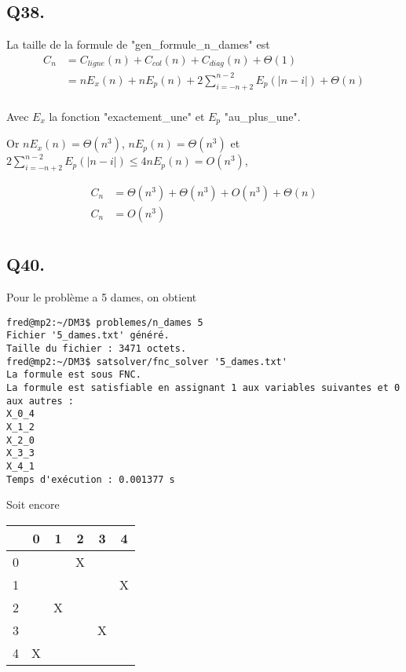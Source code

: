     \subsection*{Q38.}
    La taille de la formule de "gen\_formule\_n\_dames" est
    \begin{align*}
        C_n &= C_{ligne}(n) + C_{col}(n) + C_{diag}(n) + \Theta(1)\\
        &= nE_x(n) + nE_p(n) + 2\sum_{i=-n+2}^{n-2}E_p(|n-i|) + \Theta(n)\\
    \end{align*}
    
    Avec $E_x$ la fonction "exactement\_une" et $E_p$ "au\_plus\_une".
    
    Or $nE_x(n) = \Theta(n^3)$, $nE_p(n) = \Theta(n^3)$ et
    $2\sum_{i=-n+2}^{n-2}E_p(|n-i|) \leq 4nE_p(n) = O(n^3)$,
    
    \begin{align*}
        C_n &= \Theta(n^3) + \Theta(n^3) + O(n^3) +\Theta(n)\\
        C_n &= \boxed{O(n^3)}\\
    \end{align*}
    
    \subsection*{Q40.}
    Pour le problème a 5 dames, on obtient
    \begin{lstlisting}
fred@mp2:~/DM3$ problemes/n_dames 5
Fichier '5_dames.txt' généré.
Taille du fichier : 3471 octets.
fred@mp2:~/DM3$ satsolver/fnc_solver '5_dames.txt'
La formule est sous FNC.
La formule est satisfiable en assignant 1 aux variables suivantes et 0 aux autres :
X_0_4
X_1_2
X_2_0
X_3_3
X_4_1
Temps d'exécution : 0.001377 s
\end{lstlisting}

Soit encore
\begin{center}
    \begin{tabular}{| c || *{5}{c |}}
    \hline
      & 0 & 1 & 2 & 3 & 4 \\
    \hline
    \hline
    0 &   &   & X &   &   \\
    \hline
    1 &   &   &   &   & X \\
    \hline
    2 &   & X &   &   &   \\
    \hline
    3 &   &   &   & X &   \\
    \hline
    4 & X &   &   &   &   \\
    \hline
    \end{tabular}
\end{center}

